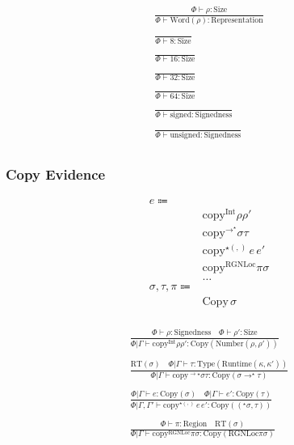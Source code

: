 \documentclass {article}
\begin{document}
\begin{gather*}
\frac
{\Phi \vdash \rho : \text{Size}}
{\Phi \vdash \text{Word} (\rho) : \text{Representation}} \\
\\
\frac
{}
{\Phi \vdash 8 : \text{Size}} \\
\\
\frac
{}
{\Phi \vdash 16 : \text{Size}} \\
\\
\frac
{}
{\Phi \vdash 32 : \text{Size}} \\
\\
\frac
{}
{\Phi \vdash 64 : \text{Size}} \\
\\
\frac
{}
{\Phi \vdash \text{signed} : \text{Signedness}} \\
\\
\frac
{}
{\Phi \vdash \text{unsigned} : \text{Signedness}} \\
\end{gather*}


\subsubsection{Copy Evidence}
\begin{align*}
e \Coloneqq & \\
& \text{copy}^\text{Int} \rho \rho' \tag{Copy Integer Proof} \\
& \text{copy}^{\to^\star} \sigma \tau \tag{Copy Function Pointer Proof} \\
& \text{copy}^{\star(,)} \, e \, e' \tag{Copy Tuple Proof} \\
& \text{copy}^{\text{RGNLoc}} \pi \sigma \tag{Copy Reference Proof}\\
& \dots \\
\sigma, \tau, \pi \Coloneqq & \\
& \text{Copy} \, \sigma \tag{Runtime Copyable} \\
\end{align*}

\begin{gather*}
\frac
{\Phi \vdash \rho : \text{Signedness} \quad \Phi \vdash \rho' : \text{Size}}
{\Phi | \Gamma \vdash \text{copy}^\text{Int} \rho \rho' : \text{Copy} (\text{Number} (\rho, \rho'))} \\
\\
\frac
{\text{RT} (\sigma) \quad \Phi | \Gamma \vdash \tau : \text{Type}(\text{Runtime}(\kappa, \kappa'))}
{\Phi | \Gamma \vdash \text{copy}^{\to\star} \sigma \tau : \text{Copy} (\sigma \to^\star \tau)} \\
\\
\frac
{\Phi | \Gamma \vdash e : \text{Copy} (\sigma) \quad \Phi | \Gamma \vdash e' : \text{Copy} (\tau)}
{\Phi | \Gamma, \Gamma' \vdash \text{copy}^{\star(,)} \, e \, e' : \text{Copy} ((^\star\sigma, \tau))} \\
\\
\frac
{\Phi \vdash \pi : \text{Region} \quad \text{RT} (\sigma)}
{\Phi | \Gamma \vdash \text{copy}^\text{RGNLoc} \pi \sigma : \text{Copy} (\text{RGNLoc} \pi \sigma)} \\
\end{gather*}
\end{document}
